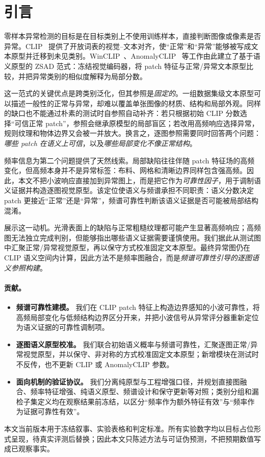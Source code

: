 \section{引言}
\label{sec:intro}

零样本异常检测的目标是在目标类别上不使用训练样本，直接判断图像或像素是否异常。CLIP~\cite{radford2021clip} 提供了开放词表的视觉--文本对齐，使“正常”和“异常”能够被写成文本原型并迁移到未见类别。WinCLIP~\cite{jeong2023winclip}、AnomalyCLIP~\cite{zhou2024anomalyclip} 等工作由此建立了基于语义原型的 ZSAD 范式：冻结视觉编码器，将 patch 特征与正常/异常文本原型比较，并把异常类别的相似度解释为局部分数。

这一范式的关键优点是跨类别泛化，但其参照是\emph{固定的}。一组数据集级文本原型可以描述一般性的正常与异常，却难以覆盖单张图像的材质、结构和局部外观。同样的缺口也不能通过朴素的测试时自参照自动补齐：若只根据初始 CLIP 分数选择“可信正常 patch”，参照会继承原模型的局部盲区；若改用高频响应选择异常，规则纹理和物体边界又会被一并放大。换言之，逐图参照需要同时回答两个问题：\emph{哪些 patch 在语义上可信}，以及\emph{哪些局部变化不像正常结构}。

频率信息为第二个问题提供了天然线索。局部缺陷往往伴随 patch 特征场的高频变化，但高频本身并不是异常标签：布料、网格和清晰边界同样包含强高频。因此，本文不把小波响应直接加到异常图上，而是把它作为\emph{可靠性因子}，用于调制语义证据并构造逐图视觉原型。该定位使语义与频谱承担不同职责：语义分数决定 patch 更接近“正常”还是“异常”，频谱可靠性判断该语义证据是否可能被局部结构混淆。

 展示这一动机。光滑表面上的缺陷与正常粗糙纹理都可能产生显著高频响应；高频图无法独立完成判别，但能够指出哪些语义证据需要谨慎使用。我们据此从测试图中汇聚正常/异常视觉原型，再以保守方式校准固定文本原型。最终异常图仍在 CLIP 语义空间内计算，因此方法不是频率图融合，而是\emph{频谱可靠性引导的逐图语义参照构建}。



\paragraph{贡献。}
\begin{itemize}[leftmargin=1.4em,itemsep=0.15em,topsep=0.2em]
\item \textbf{频谱可靠性建模。} 我们在 CLIP patch 特征上构造边界感知的小波可靠性，将高频局部变化与低频结构边界区分开来，并把小波信号从异常评分器重新定位为语义证据的可靠性调制项。
\item \textbf{逐图语义原型校准。} 我们联合初始语义概率与频谱可靠性，汇聚逐图正常/异常视觉原型，并以保守、非对称的方式校准固定文本原型；新增模块在测试时不反传，也不更新 CLIP 或 AnomalyCLIP 参数。
\item \textbf{面向机制的验证协议。} 我们分离纯原型与工程增强口径，并规划直接图融合、频率特征增强、纯语义原型、频谱设计和保守更新等对照；类别分组和漏检子集定义均在观察结果前冻结，以区分“频率作为额外特征有效”与“频率作为证据可靠性有效”。
\end{itemize}

本文当前版本用于冻结叙事、实验表格和判定标准。所有实验数字均以目标占位形式呈现，待真实评测后替换；因此本文只陈述方法与可证伪预测，不把预期数值写成已观察事实。
